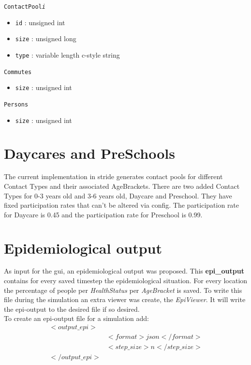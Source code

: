 \texttt{ContactPool\textit{i}}
\begin{itemize}
\item \texttt{id} : unsigned int 
\item \texttt{size} : unsigned long 
\item \texttt{type} : variable length c-style string
\end{itemize}

\texttt{Commutes}
\begin{itemize}
\item \texttt{size} : unsigned int
\end{itemize}

\texttt{Persons}
\begin{itemize}
\item \texttt{size} : unsigned int
\end{itemize}

\section{Daycares and PreSchools}
\label{section:Dataycares and PreSchools}
The current implementation in stride generates contact pools for different Contact Types and their associated AgeBrackets. There are two added Contact Types for 0-3 years old and 3-6 years old, Daycare and Preschool. They have fixed participation rates that can't be altered via config. The participation rate for Daycare is 0.45 and the participation rate for Preschool is 0.99.

\section{Epidemiological output}
As input for the gui, an epidemiological output was proposed. This \textbf{epi\_output} contains for every saved timestep the epidemiological situation. For every location the percentage of people per \textit{HealthStatus} per \textit{AgeBracket} is saved. To write this file during the simulation an extra viewer was create, the \textit{EpiViewer}. It will write the epi-output to the desired file if so desired.\\
To create an epi-output file for a simulation add:
\begin{equation}
\begin{split}
<output\_epi>&	\\
			&<format>json</format>\\
			&<step\_size>n</step\_size>\\
</output\_epi>&
\end{split}
\end{equation}

